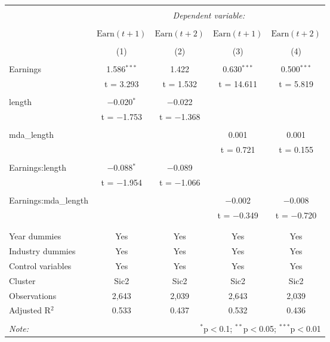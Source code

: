 \documentclass[a4paper]{article}
\begin{document}
\begin{center}
\begin{longtable}{@{\extracolsep{5pt}}lcccc} 
\\[-1.8ex]\hline 
\hline \\[-1.8ex] 
 & \multicolumn{4}{c}{\textit{Dependent variable:}} \\ 
\cline{2-5} 
\\[-1.8ex] & \(\text{Earn}(t{+}1)\) & \(\text{Earn}(t{+}2)\) & \(\text{Earn}(t{+}1)\) & \(\text{Earn}(t{+}2)\) \\ 
\\[-1.8ex] & (1) & (2) & (3) & (4)\\ 
\hline \\[-1.8ex] 
 Earnings & 1.586$^{***}$ & 1.422 & 0.630$^{***}$ & 0.500$^{***}$ \\ 
  & t = 3.293 & t = 1.532 & t = 14.611 & t = 5.819 \\ 
  & & & & \\ 
 length & $-$0.020$^{*}$ & $-$0.022 &  &  \\ 
  & t = $-$1.753 & t = $-$1.368 &  &  \\ 
  & & & & \\ 
 mda\_length &  &  & 0.001 & 0.001 \\ 
  &  &  & t = 0.721 & t = 0.155 \\ 
  & & & & \\ 
 Earnings:length & $-$0.088$^{*}$ & $-$0.089 &  &  \\ 
  & t = $-$1.954 & t = $-$1.066 &  &  \\ 
  & & & & \\ 
 Earnings:mda\_length &  &  & $-$0.002 & $-$0.008 \\ 
  &  &  & t = $-$0.349 & t = $-$0.720 \\ 
  & & & & \\ 
  \hline \\[-1.8ex] 
Year dummies & Yes & Yes & Yes & Yes \\ 
Industry dummies & Yes & Yes & Yes & Yes \\ 
Control variables & Yes & Yes & Yes & Yes \\ 
Cluster & Sic2 & Sic2 & Sic2 & Sic2 \\ 
Observations & 2,643 & 2,039 & 2,643 & 2,039 \\ 
Adjusted R$^{2}$ & 0.533 & 0.437 & 0.532 & 0.436 \\ 
\hline 
\hline \\[-1.8ex] 
\textit{Note:}  & \multicolumn{4}{r}{$^{*}$p$<$0.1; $^{**}$p$<$0.05; $^{***}$p$<$0.01} \\ 
\end{longtable}
\end{center}
\end{document}
